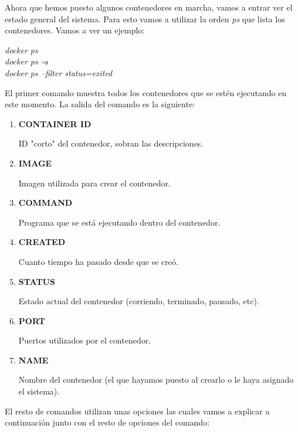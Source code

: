 \documentclass[]{article}
\begin{document}
Ahora que hemos puesto algunos contenedores en marcha, vamos a entrar ver el estado general del sistema. Para esto vamos a utilizar la orden
{\it ps} que lista los contenedores. Vamos a ver un ejemplo:

\begin{center}
\it
	docker ps
	\\
	\vspace{1mm}
	docker ps -a
	\\
	\vspace{1mm}
	docker ps --filter status=exited
\end{center}
El primer comando muestra todos los contenedores que se estén ejecutando en este momento.
La salida del comando es la siguiente:
\begin{enumerate}
	\item {\bf CONTAINER ID}
	
		ID "corto" del contenedor, sobran las descripciones.
		
	\item {\bf IMAGE}
	
		Imagen utilizada para crear el contenedor.
	\item {\bf COMMAND}
	
		Programa que se está ejecutando dentro del contenedor.
	\item {\bf CREATED}
	
		Cuanto tiempo ha pasado desde que se creó.
	\item {\bf STATUS}
	
		Estado actual del contenedor (corriendo, terminado, pausado, etc).
	\item {\bf PORT}
	
		Puertos utilizados por el contenedor.
	\item {\bf NAME}
	
		Nombre del contenedor (el que hayamos puesto al crearlo o le haya asignado el sistema).

\end{enumerate}

El resto de comandos utilizan unas opciones las cuales vamos a explicar a continuación junto con el resto de opciones del comando:
\end{document}
